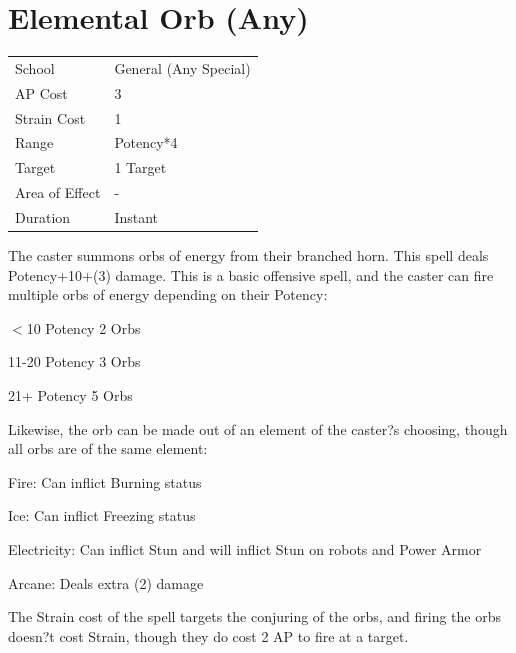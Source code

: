 \documentclass[11pt,a4paper,twocolumn]{book}
\begin{document}
		\section*{Elemental Orb (Any)}
	{
		\begin{tabu} to 75mm{| X[l,4] | X[l,7] |}
			\hline
			School 			&  General (Any Special)\\
			AP Cost	      	&  3					\\
			Strain Cost     &  1					\\
			Range     		&  Potency*4			\\
			Target      	&  1 Target				\\
			Area of Effect  &  -	 				\\
			Duration     	&  Instant				\\ \hline
		\end{tabu}
		
	}
	
	\medskip
	
	The caster summons orbs of energy from their branched horn. This spell deals Potency+10+(3) damage. This is a basic offensive spell, and the caster can fire multiple orbs of energy depending on their Potency:
	
	\begin{compactitem}
		\item $<$10 Potency 		2 Orbs
		\item 11-20 Potency 		3 Orbs
		\item 21+ Potency 			5 Orbs
	\end{compactitem}
	
	Likewise, the orb can be made out of an element of the caster?s choosing, though all orbs are of the same element:
	
	\begin{compactitem}
		\item Fire: Can inflict Burning status
		\item Ice: Can inflict Freezing status
		\item Electricity: Can inflict Stun and will inflict Stun on robots and Power Armor
		\item Arcane: Deals extra (2) damage
	\end{compactitem}
	
	The Strain cost of the spell targets the conjuring of the orbs, and firing the orbs doesn?t cost Strain, though they do cost 2 AP to fire at a target.
	
\end{document}

